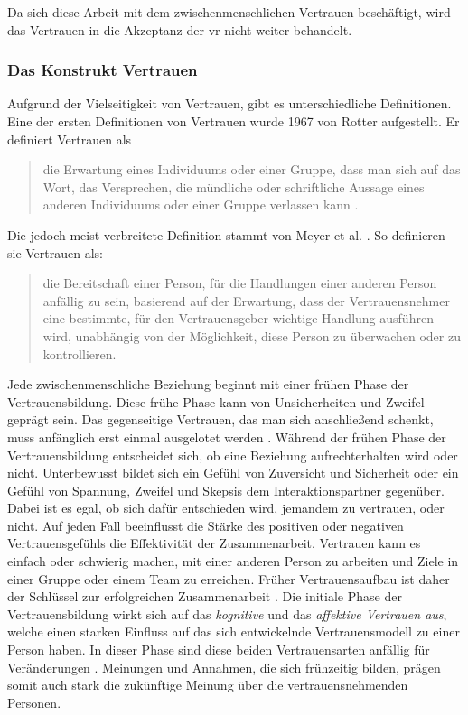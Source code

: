 \documentclass[a4paper,11pt]{article}%
\renewcommand{\\}{\vspace*{0.5\baselineskip} \newline}
\begin{document}
{Da sich diese Arbeit mit dem zwischenmenschlichen Vertrauen beschäftigt, wird das Vertrauen in die Akzeptanz der \ac{vr} nicht weiter behandelt.
\subsubsection{Das Konstrukt Vertrauen}
\label{Konstrukt des Vertrauens}
Aufgrund der Vielseitigkeit von Vertrauen, gibt es unterschiedliche Definitionen. \newline
Eine der ersten Definitionen von Vertrauen wurde 1967 von Rotter aufgestellt. Er definiert Vertrauen als 
\begin{quote}
\glqq{}die Erwartung eines Individuums oder einer Gruppe, dass man sich auf das Wort, das Versprechen, die mündliche oder schriftliche Aussage eines anderen Individuums oder einer Gruppe verlassen kann\dq{} \citep[S. 651]{rotter1967new}.
\end{quote}
Die jedoch meist verbreitete Definition stammt von Meyer et al. \citep[S. 712]{mayer1995integrative}. So definieren sie Vertrauen als:
\begin{quote} \glqq{}die Bereitschaft einer Person, für die Handlungen einer anderen Person anfällig zu sein, basierend auf der Erwartung, dass der Vertrauensnehmer eine bestimmte, für den Vertrauensgeber wichtige Handlung ausführen wird, unabhängig von der Möglichkeit, diese Person zu überwachen oder zu kontrollieren.\dq{} \end{quote}
Jede zwischenmenschliche Beziehung beginnt mit einer frühen Phase der Vertrauensbildung. Diese frühe Phase kann von Unsicherheiten und Zweifel geprägt sein. Das gegenseitige Vertrauen, das man sich anschließend schenkt, muss anfänglich erst einmal ausgelotet werden \citep[S. 166-168]{meyerson1996swift}.
Während der frühen Phase der Vertrauensbildung entscheidet sich, ob eine Beziehung aufrechterhalten wird oder nicht. Unterbewusst bildet sich ein Gefühl von Zuversicht und Sicherheit oder ein Gefühl von Spannung, Zweifel und Skepsis dem Interaktionspartner gegenüber. 
Dabei ist es egal, ob sich dafür entschieden wird, jemandem zu vertrauen, oder nicht. Auf jeden Fall beeinflusst die Stärke des positiven oder negativen Vertrauensgefühls die Effektivität der Zusammenarbeit. Vertrauen kann es einfach oder schwierig machen, mit einer anderen Person zu arbeiten und Ziele in einer Gruppe oder einem Team zu erreichen.
Früher Vertrauensaufbau ist daher der Schlüssel zur erfolgreichen Zusammenarbeit \citep[S. 405-406]{bigley1998straining}.
Die initiale Phase der Vertrauensbildung wirkt sich auf das \textit{kognitive} und das \textit{affektive Vertrauen aus}, welche einen starken Einfluss auf das sich entwickelnde Vertrauensmodell zu einer Person haben. In dieser Phase sind diese beiden Vertrauensarten anfällig für Veränderungen \citep[S. 461-462]{baldwin1992relational}.
Meinungen und Annahmen, die sich frühzeitig bilden, prägen somit auch stark die zukünftige Meinung über die vertrauensnehmenden Personen.

}
\end{document}
